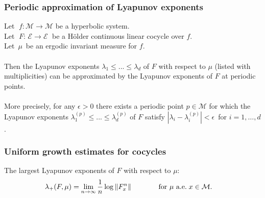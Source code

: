 \documentclass[potrait]{beamer}
\newcommand{\N}{\mathbb N}
\def\E{\mathcal{E}}
\def\M{\mathcal{M}}
\def\N{\mathbb N}
\def\e{\epsilon}
\begin{document}



\begin{frame}[t]\frametitle{Periodic approximation of Lyapunov exponents}



\begin{theorem} [B.K. 2008]

Let $\;f:\M \to \M$ be a hyperbolic system. \\
Let $\;F:\,\E \to \E\;$ be a H\"older continuous linear cocycle over $f$. \\
Let $\,\mu\,$ be  an ergodic invariant measure for $f$. 
\\
\ \\
Then the Lyapunov exponents $\lambda_1 \le ... \le \lambda_d$ 
 of $F$ with respect 
 to $\mu$ (listed with multiplicities) can be approximated 
by the Lyapunov exponents of $F$ at periodic points. 
 \\
\ \\
More precisely,
for any $\e >0$ there exists a periodic point $p \in \M$ for which the Lyapunov 
exponents $\lambda_1^{(p)} \le ... \le \lambda_d^{(p)}$ of $F$ satisfy
$|\lambda_i-\lambda_i^{(p)}|<\e\,$ for $i=1, \dots , d$.


\end{theorem} 

\end{frame}


\begin{frame}[t]\frametitle{Uniform growth estimates for cocycles}




The largest  Lyapunov exponents of $F$ with respect to $\mu$:
$$
\lambda_+(F,\mu)=  \lim_{n \to \infty} \frac 1n \log \| F_x ^n \| 
\quad \quad\quad\;\;\;\text{for } \mu \text { a.e.} \; x\in \M .\hskip.4cm
$$


\end{frame}
\end{document}
